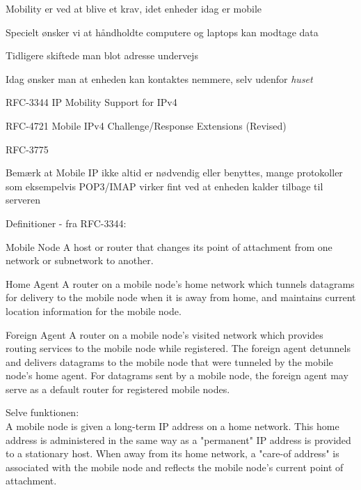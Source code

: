 \begin{list1}
\item Mobility er ved at blive et krav, idet enheder idag er mobile
\item Specielt ønsker vi at håndholdte computere og laptops kan modtage data
\item Tidligere skiftede man blot adresse undervejs
\item Idag ønsker man at enheden kan kontaktes nemmere, selv udenfor \emph{huset}
\item RFC-3344 IP Mobility Support for IPv4
\item RFC-4721 Mobile IPv4 Challenge/Response Extensions (Revised)
\item RFC-3775
\item {}
\item Bemærk at Mobile IP ikke altid er nødvendig eller benyttes, mange protokoller som eksempelvis POP3/IMAP virker fint ved at enheden kalder tilbage til serveren
\end{list1}


\begin{list1}
\item Definitioner - fra RFC-3344:
\begin{list2}
\item Mobile Node A host or router that changes its point of attachment from one
         network or subnetwork to another. 
\item Home Agent A router on a mobile node's home network which tunnels
         datagrams for delivery to the mobile node when it is away from
         home, and maintains current location information for the mobile
         node.
\item Foreign Agent A router on a mobile node's visited network which provides
         routing services to the mobile node while registered.  The
         foreign agent detunnels and delivers datagrams to the mobile
         node that were tunneled by the mobile node's home agent.  For
         datagrams sent by a mobile node, the foreign agent may serve as
         a default router for registered mobile nodes.
\end{list2}
\item Selve funktionen:\\
   A mobile node is given a long-term IP address on a home network.
   This home address is administered in the same way as a "permanent" IP
   address is provided to a stationary host.  When away from its home
   network, a "care-of address" is associated with the mobile node and
   reflects the mobile node's current point of attachment. 
\end{list1}

